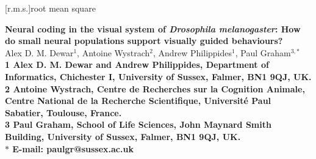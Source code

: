 \date{}

\pagestyle{myheadings}



\usepackage{verbatim} %

\usepackage[utf8]{inputenc}

\usepackage{gensymb} %

\usepackage{acronym}
[r.m.s.]{root mean square}

\newcommand{\Matlab}{MATLAB}



\begin{flushleft}
{\Large
\textbf{Neural coding in the visual system of \emph{Drosophila melanogaster}: How do small neural populations support visually guided behaviours?}
}
\\
Alex D. M. Dewar$^{1}$,
Antoine Wystrach$^{2}$,
Andrew Philippides$^{1}$,
Paul Graham$^{3,\ast}$
\\
\bf{1} Alex D. M. Dewar and Andrew Philippides, Department of Informatics, Chichester I, University of Sussex, Falmer, BN1 9QJ, UK.
\\
\bf{2} Antoine Wystrach, Centre de Recherches sur la Cognition Animale, Centre National de la Recherche Scientifique, Université Paul Sabatier, Toulouse, France.
\\
\bf{3} Paul Graham, School of Life Sciences, John Maynard Smith Building, University of Sussex, Falmer, BN1 9QJ, UK.
\\
$\ast$ E-mail: paulgr@sussex.ac.uk
\end{flushleft}


